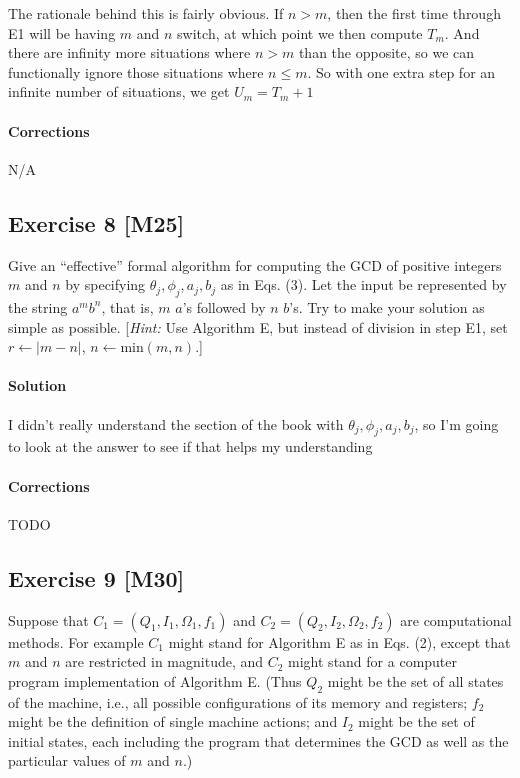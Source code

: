 \documentclass{report}
\newcommand{\say}[1]{``#1''}
\begin{document}
			The rationale behind this is fairly obvious. If $n > m$, then the first time through E1 will be having $m$ and $n$ switch, at which point we then compute $T_m$. And there are infinity more situations where $n > m$ than the opposite, so we can functionally ignore those situations where $n \leq m$. So with one extra step for an infinite number of situations, we get $U_m = T_m + 1$
			
			\paragraph{Corrections} N/A
		
		\subsection*{Exercise 8 [M25]} 
		
			Give an \say{effective} formal algorithm for computing the GCD of positive integers $m$ and $n$ by specifying $\theta_j, \phi_j, a_j, b_j$ as in Eqs. (3). Let the input be represented by the string $a^m b^n$, that is, $m$ $a$'s followed by $n$ $b$'s. Try to make your solution as simple as possible. [\textit{Hint:} Use Algorithm E, but instead of division in step E1, set $r \leftarrow |m-n|$, $n \leftarrow \text{min}(m,n)$.]
			
			\paragraph{Solution} I didn't really understand the section of the book with $\theta_j, \phi_j, a_j, b_j$, so I'm going to look at the answer to see if that helps my understanding
			
			\paragraph{Corrections} TODO
			
		
		\subsection*{Exercise 9 [M30]} 
		
			Suppose that $C_1 = (Q_1, I_1, \Omega_1, f_1)$ and $C_2 = (Q_2, I_2, \Omega_2, f_2)$ are computational methods. For example $C_1$ might stand for Algorithm E as in Eqs. (2), except that $m$ and $n$ are restricted in magnitude, and $C_2$ might stand for a computer program implementation of Algorithm E. (Thus $Q_2$ might be the set of all states of the machine, i.e., all possible configurations of its memory and registers; $f_2$ might be the definition of single machine actions; and $I_2$ might be the set of initial states, each including the program that determines the GCD as well as the particular values of $m$ and $n$.)
			
\end{document}
